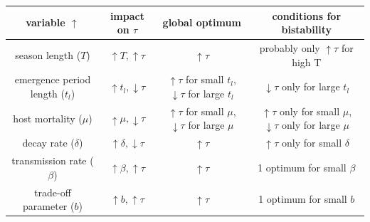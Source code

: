 \documentclass{article}
\begin{document}
\begin{center}
\begin{tabular}{ |c|c|c|c| } 
\hline
variable $\uparrow$ & impact on $\tau$ & global optimum & conditions for bistability \\
\hline
season length ($T$) &  $\uparrow T,  \uparrow \tau$ & $\uparrow \tau$ & probably only $\uparrow \tau$ for high T\\ 
emergence period length ($t_{l}$) & $\uparrow t_{l},  \downarrow \tau$ & $\uparrow \tau$ for small $t_{l}$, $\downarrow \tau$ for large $t_{l}$ & $\downarrow \tau$ only for large $t_{l}$\\ 
host mortality ($\mu$) & $\uparrow \mu,  \downarrow \tau$ & $\uparrow \tau$ for small $\mu$, $\downarrow \tau$ for large $\mu$ & $\uparrow \tau$ only for small $\mu$,  $\downarrow \tau$ only for large $\mu$  \\ 
decay rate ($\delta$) & $\uparrow \delta, \downarrow \tau $ & $ \uparrow \tau$ & $ \uparrow \tau$ only for small $\delta$\\
transmission rate ($\beta$) & $\uparrow \beta, \uparrow \tau$ & $\uparrow \tau$ & 1 optimum for small $\beta$\\
trade-off parameter ($b$) & $\uparrow b, \uparrow \tau$ & $\uparrow \tau$ & 1 optimum for small $b$\\
\hline
\end{tabular}
\end{center}
\end{document}
